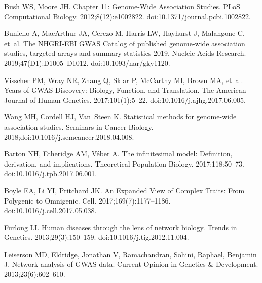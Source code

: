 \documentclass[10pt,letterpaper]{article}
\begin{document}
\nolinenumbers

%  
\begin{thebibliography}{10}

  Bush WS, Moore JH.
  \newblock Chapter 11: {Genome}-{Wide} {Association} {Studies}.
  \newblock PLoS Computational Biology. 2012;8(12):e1002822.
  \newblock doi:{10.1371/journal.pcbi.1002822}.
  
  Buniello A, MacArthur JA, Cerezo M, Harris LW, Hayhurst J, Malangone C, et~al.
  \newblock The {NHGRI}-{EBI} {GWAS} {Catalog} of published genome-wide
    association studies, targeted arrays and summary statistics 2019.
  \newblock Nucleic Acids Research. 2019;47(D1):D1005--D1012.
  \newblock doi:{10.1093/nar/gky1120}.
  
  Visscher PM, Wray NR, Zhang Q, Sklar P, McCarthy MI, Brown MA, et~al.
   {Years} of {GWAS} {Discovery}: {Biology}, {Function}, and
    {Translation}.
  \newblock The American Journal of Human Genetics. 2017;101(1):5--22.
  \newblock doi:{10.1016/j.ajhg.2017.06.005}.
  
  Wang MH, Cordell HJ, Van~Steen K.
  \newblock Statistical methods for genome-wide association studies.
  \newblock Seminars in Cancer Biology.
    2018;doi:{10.1016/j.semcancer.2018.04.008}.
  
  Barton NH, Etheridge AM, Véber A.
  \newblock The infinitesimal model: {Definition}, derivation, and implications.
  \newblock Theoretical Population Biology. 2017;118:50--73.
  \newblock doi:{10.1016/j.tpb.2017.06.001}.
  
  Boyle EA, Li YI, Pritchard JK.
  \newblock An {Expanded} {View} of {Complex} {Traits}: {From} {Polygenic} to
    {Omnigenic}.
  \newblock Cell. 2017;169(7):1177--1186.
  \newblock doi:{10.1016/j.cell.2017.05.038}.
  
  Furlong LI.
  \newblock Human diseases through the lens of network biology.
  \newblock Trends in Genetics. 2013;29(3):150--159.
  \newblock doi:{10.1016/j.tig.2012.11.004}.
  
  Leiserson MD, {Eldridge, Jonathan V}, {Ramachandran, Sohini}, {Raphael,
    Benjamin J}.
  \newblock Network analysis of {GWAS} data.
  \newblock Current Opinion in Genetics \& Development. 2013;23(6):602--610.
  

\end{thebibliography}
\end{document}

